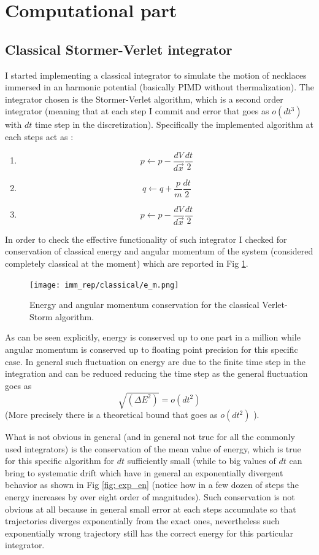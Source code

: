 \documentclass[10pt,a4paper]{article}
\begin{document}
\section{Computational part}
\subsection{Classical Stormer-Verlet integrator}
I started implementing a classical integrator to simulate the motion of necklaces immersed in an harmonic potential (basically PIMD without thermalization).
The integrator chosen is the Stormer-Verlet algorithm, which is a second order integrator (meaning that at each step I commit and error that goes as $o(dt^3)$ with $dt$ time step in the discretization). Specifically the implemented algorithm at each steps act as :
\begin{enumerate}
	\item \[p \leftarrow p - \frac{dV}{d\vec{x}}\frac{dt}{2}\]
	\item \[ q \leftarrow q + \frac{p}{m}\frac{dt}{2}\]
	\item \[ p \leftarrow p - \frac{dV}{d\vec{x}}\frac{dt}{2}\]
\end{enumerate}
In order to check the effective functionality of such integrator I checked for conservation of classical energy and angular momentum of the system (considered completely classical at the moment) which are reported in Fig \ref{fig: e_m}.
\begin{figure}[h]
	\begin{center}
		\texttt{[image: imm\_rep/classical/e\_m.png]}
	\end{center}
	\caption{Energy and angular momentum conservation for the classical Verlet-Storm algorithm.}
	\label{fig: e_m}
\end{figure}
As can be seen explicitly, energy is conserved up to one part in a million while angular momentum is conserved up to floating point precision for this specific case. In general such fluctuation on energy are due to the finite time step in the integration and can be reduced reducing the time step as the general fluctuation goes as
\[ \sqrt{(\Delta E^2)} = o(dt^2)  \]
(More precisely there is a theoretical bound that goes as $o(dt^2)$ ).

What is not obvious in general (and in general not true for all the commonly used integrators) is the conservation of the mean value of energy, which is true for this specific algorithm for $dt$ sufficiently small (while to big values of $dt$ can bring to systematic drift which have in general an exponentially divergent behavior as shown in Fig \ref{fig: exp_en} (notice how in a few dozen of steps the energy increases by over eight order of magnitudes). Such conservation is not obvious at all because in general small error at each steps accumulate so that trajectories diverges exponentially from the exact ones, nevertheless such exponentially wrong trajectory still has the correct energy for this particular integrator.
\end{document}
